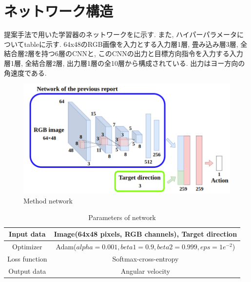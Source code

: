 
\section{ネットワーク構造}
提案手法で用いた学習器のネットワークをに示す. また, ハイパーパラメータについてtableに示す. 64x48のRGB画像を入力とする入力層1層, 畳み込み層3層, 全結合層2層を持つ6層のCNNと, このCNNの出力と目標方向指令を入力する入力層1層, 全結合層2層, 出力層1層の全10層から構成されている. 出力はヨー方向の角速度である.

\begin{figure}[hbtp]
  \centering
 \includegraphics[keepaspectratio, scale=0.43]
      {images/network_structure2.png}
 \caption{Method network}
 \label{Fig:network_structure}
\end{figure}

\begin{table}[hbtp]
  \caption{Parameters of network}
  \label{table:param1}
  \centering
  \begin{tabular}{|c|c|}
    \hline
    Input data & Image(64x48 pixels, RGB channels), Target direction \\
    \hline
    Optimizer & Adam($alpha = 0.001, beta1 = 0.9, beta2 =  0.999, eps = 1e^{-2}$)\\
    \hline
    Loss function & Softmax-cross-entropy\\
    \hline
    Output data & Angular velocity\\
    \hline
  \end{tabular}
\end{table}


\newpage
